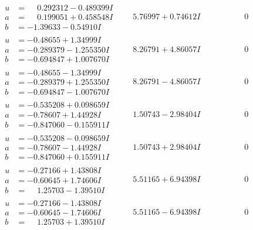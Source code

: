 \documentclass[1p]{elsarticle_modified}
\theoremstyle{definition}
\begin{document}
$$\begin{array}{c|c|c}
\begin{aligned}
u &= \phantom{-}0.292312 - 0.489399 I \\
a &= \phantom{-}0.199051 + 0.458548 I \\
b &= -1.39633 - 0.54910 I\end{aligned}
 & \phantom{-}5.76997 + 0.74612 I & \phantom{-0.000000 } 0 \\ \hline\begin{aligned}
u &= -0.48655 + 1.34999 I \\
a &= -0.289379 - 1.255350 I \\
b &= -0.694847 + 1.007670 I\end{aligned}
 & \phantom{-}8.26791 + 4.86057 I & \phantom{-0.000000 } 0 \\ \hline\begin{aligned}
u &= -0.48655 - 1.34999 I \\
a &= -0.289379 + 1.255350 I \\
b &= -0.694847 - 1.007670 I\end{aligned}
 & \phantom{-}8.26791 - 4.86057 I & \phantom{-0.000000 } 0 \\ \hline\begin{aligned}
u &= -0.535208 + 0.098659 I \\
a &= -0.78607 + 1.44928 I \\
b &= -0.847060 - 0.155911 I\end{aligned}
 & \phantom{-}1.50743 - 2.98404 I & \phantom{-0.000000 } 0 \\ \hline\begin{aligned}
u &= -0.535208 - 0.098659 I \\
a &= -0.78607 - 1.44928 I \\
b &= -0.847060 + 0.155911 I\end{aligned}
 & \phantom{-}1.50743 + 2.98404 I & \phantom{-0.000000 } 0 \\ \hline\begin{aligned}
u &= -0.27166 + 1.43808 I \\
a &= -0.60645 + 1.74606 I \\
b &= \phantom{-}1.25703 - 1.39510 I\end{aligned}
 & \phantom{-}5.51165 + 6.94398 I & \phantom{-0.000000 } 0 \\ \hline\begin{aligned}
u &= -0.27166 - 1.43808 I \\
a &= -0.60645 - 1.74606 I \\
b &= \phantom{-}1.25703 + 1.39510 I\end{aligned}
 & \phantom{-}5.51165 - 6.94398 I & \phantom{-0.000000 } 0 \\ \hline\begin{aligned}

\end{aligned}
\end{array}$$
\end{document}
